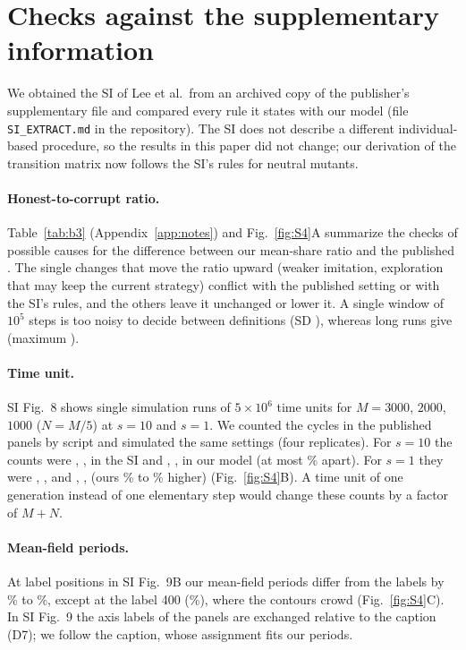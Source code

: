 \documentclass[11pt]{article}
\begin{document}
\section{Checks against the supplementary information}\label{app:si}

We obtained the SI of Lee et al.\ from an archived copy of the publisher's supplementary file and
compared every rule it states with our model (file \texttt{SI\_EXTRACT.md} in the repository).
The SI does not describe a different individual-based procedure, so the results in this paper
did not change; our derivation of the transition matrix now follows the SI's rules for
neutral mutants.

\paragraph{Honest-to-corrupt ratio.} Table~\ref{tab:b3} (Appendix~\ref{app:notes}) and
Fig.~\ref{fig:S4}A summarize the checks of possible causes for the difference between our
mean-share ratio and the published \PaperRatio{}. The single changes that move the ratio upward
(weaker imitation, exploration that may keep the current strategy) conflict with the published
setting or with the SI's rules, and the others leave it unchanged or lower it. A single window of
$10^5$ steps is too noisy to decide between definitions (SD \ShortRunSD), whereas
\LongRunN{} long runs give \LongRunMean{} (maximum \LongRunMax).

\paragraph{Time unit.} SI Fig.~8 shows single simulation runs of $5\times10^6$ time units for
$M=3000$, $2000$, $1000$ ($N=M/5$) at $s=10$ and $s=1$. We counted the cycles in the published
panels by script and simulated the same settings (four replicates). For $s=10$ the counts were
\SIEightA, \SIEightD, \SIEightG{} in the SI and \OurEightA, \OurEightD, \OurEightG{} in our model
(at most \EightMaxDevStrong\% apart). For $s=1$ they were \SIEightB, \SIEightE, \SIEightH{} and
\OurEightB, \OurEightE, \OurEightH{} (ours \EightMinDevWeak\% to \EightMaxDevWeak\% higher)
(Fig.~\ref{fig:S4}B). A time unit of one generation instead of one elementary step would change
these counts by a factor of $M+N$.

\paragraph{Mean-field periods.} At \NineNpoints{} label positions in SI Fig.~9B our mean-field
periods differ from the labels by \NineMinDev\% to \NineMaxDev\%, except at the label 400
(\NineDevFourHundred\%), where the contours crowd (Fig.~\ref{fig:S4}C). In SI Fig.~9 the axis
labels of the panels are exchanged relative to the caption (D7); we follow the caption, whose
assignment fits our periods.
\end{document}
